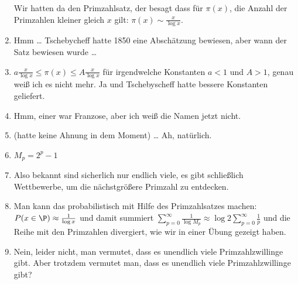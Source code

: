 \documentclass{scrartcl}
\begin{document}
\begin{enumerate}
		Wir hatten da den Primzahlsatz, der besagt dass für $\pi(x)$, die Anzahl der Primzahlen kleiner gleich $x$ gilt: $\pi(x) \sim \frac{x}{\log x}$.
	\item
		Hmm … Tschebycheff hatte 1850 eine Abschätzung bewiesen, aber wann der Satz bewiesen wurde …
	\item
		$a \frac{x}{\log x} \le \pi(x) \le A \frac{x}{\log x}$ für irgendwelche Konstanten $a < 1$ und $A > 1$, genau weiß ich es nicht mehr.
		Ja und Tschebyscheff hatte bessere Konstanten geliefert.
	\item
		Hmm, einer war Franzose, aber ich weiß die Namen jetzt nicht.
	\item
		(hatte keine Ahnung in dem Moment) …
		Ah, natürlich.
	\item
		$M_p = 2^p - 1$
	\item
		Also bekannt sind sicherlich nur endlich viele, es gibt schließlich Wettbewerbe, um die nächstgrößere Primzahl zu entdecken.
	\item
		Man kann das probabilistisch mit Hilfe des Primzahlsatzes machen: $P(x \in \P) \approx \frac{1}{\log x}$ und damit summiert $\sum_{p=0}^\infty \frac{1}{\log{M_p}} \approx \log 2 \sum_{p=0}^\infty \frac{1}{p}$ und die Reihe mit den Primzahlen divergiert, wie wir in einer Übung gezeigt haben.
	\item
		Nein, leider nicht, man vermutet, dass es unendlich viele Primzahlzwillinge gibt.
		Aber trotzdem vermutet man, dass es unendlich viele Primzahlzwillinge gibt?

\end{enumerate}
\end{document}
